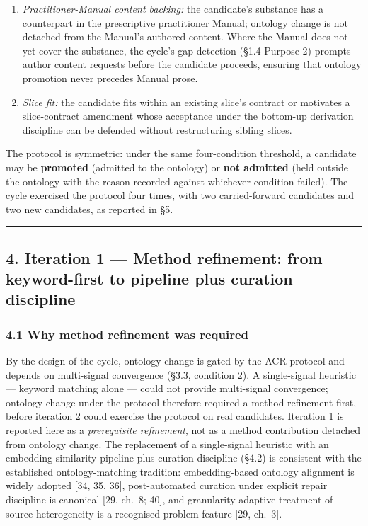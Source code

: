 \documentclass[
]{article}
\begin{document}
\begin{enumerate}
  statistical independence among the signals.
\item
  \emph{Practitioner-Manual content backing:} the candidate's substance
  has a counterpart in the prescriptive practitioner Manual; ontology
  change is not detached from the Manual's authored content. Where the
  Manual does not yet cover the substance, the cycle's gap-detection
  (§1.4 Purpose 2) prompts author content requests before the candidate
  proceeds, ensuring that ontology promotion never precedes Manual
  prose.
\item
  \emph{Slice fit:} the candidate fits within an existing slice's
  contract or motivates a slice-contract amendment whose acceptance
  under the bottom-up derivation discipline can be defended without
  restructuring sibling slices.
\end{enumerate}

The protocol is symmetric: under the same four-condition threshold, a
candidate may be \textbf{promoted} (admitted to the ontology) or
\textbf{not admitted} (held outside the ontology with the reason
recorded against whichever condition failed). The cycle exercised the
protocol four times, with two carried-forward candidates and two new
candidates, as reported in §5.

\begin{center}\rule{0.5\linewidth}{0.5pt}\end{center}

\subsection{4. Iteration 1 --- Method refinement: from keyword-first to
pipeline plus curation
discipline}\label{iteration-1-method-refinement-from-keyword-first-to-pipeline-plus-curation-discipline}

\subsubsection{4.1 Why method refinement was
required}\label{why-method-refinement-was-required}

By the design of the cycle, ontology change is gated by the ACR protocol
and depends on multi-signal convergence (§3.3, condition 2). A
single-signal heuristic --- keyword matching alone --- could not provide
multi-signal convergence; ontology change under the protocol therefore
required a method refinement first, before iteration 2 could exercise
the protocol on real candidates. Iteration 1 is reported here as a
\emph{prerequisite refinement}, not as a method contribution detached
from ontology change. The replacement of a single-signal heuristic with
an embedding-similarity pipeline plus curation discipline (§4.2) is
consistent with the established ontology-matching tradition:
embedding-based ontology alignment is widely adopted {[}34, 35, 36{]},
post-automated curation under explicit repair discipline is canonical
{[}29, ch.~8; 40{]}, and granularity-adaptive treatment of source
heterogeneity is a recognised problem feature {[}29, ch.~3{]}.
\end{document}
